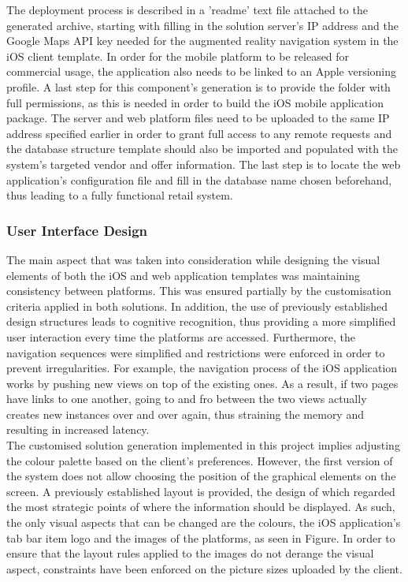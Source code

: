 The deployment process is described in a 'readme' text file attached to the generated archive, starting with filling in the solution server's IP address and the Google Maps API key needed for the augmented reality navigation system in the iOS client template. In order for the mobile platform to be released for commercial usage, the application also needs to be linked to an Apple versioning profile. A last step for this component's generation is to provide the folder with full permissions, as this is needed in order to build the iOS mobile application package. The server and web platform files need to be uploaded to the same IP address specified earlier in order to grant full access to any remote requests and the database structure template should also be imported and populated with the system's targeted vendor and offer information. The last step is to locate the web application's configuration file and fill in the database name chosen beforehand, thus leading to a fully functional retail system.\\

\subsubsection{User Interface Design}

The main aspect that was taken into consideration while designing the visual elements of both the iOS and web application templates was maintaining consistency between platforms. This was ensured partially by the customisation criteria applied in both solutions. In addition, the use of previously established design structures leads to cognitive recognition, thus providing a more simplified user interaction every time the platforms are accessed. Furthermore, the navigation sequences were simplified and restrictions were enforced in order to prevent irregularities. For example, the navigation process of the iOS application works by pushing new views on top of the existing ones. As a result, if two pages have links to one another, going to and fro between the two views actually creates new instances over and over again, thus straining the memory and resulting in increased latency.\\

The customised solution generation implemented in this project implies adjusting the colour palette based on the client's preferences. However, the first version of the system does not allow choosing the position of the graphical elements on the screen. A previously established layout is provided, the design of which regarded the most strategic points of where the information should be displayed. As such, the only visual aspects that can be changed are the colours, the iOS application's tab bar item logo and the images of the platforms, as seen in Figure. In order to ensure that the layout rules applied to the images do not derange the visual aspect, constraints have been enforced on the picture sizes uploaded by the client.\\

